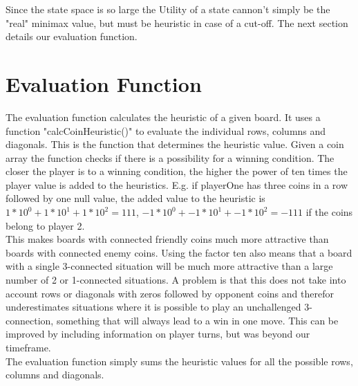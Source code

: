 \documentclass[11pt, a4paper]{article}
\begin{document}
Since the state space is so large the Utility of a state cannon't simply be the "real" minimax value, but must be heuristic in case of a cut-off. The next section details our evaluation function.

\section*{Evaluation Function}

The evaluation function calculates the heuristic of a given board. It uses a function "calcCoinHeuristic()" to evaluate the individual rows, columns and diagonals. This is the function that determines the heuristic value. Given a coin array the function checks if there is a possibility for a winning condition. The closer the player is to a winning condition, the higher the power of ten times the player value is added to the heuristics. E.g. if playerOne has three coins in a row followed by one null value, the added value to the heuristic is $1*10^0+1*10^1+1*10^2 = 111$, $-1*10^0+-1*10^1+-1*10^2 = -111$ if the coins belong to player 2.\\

This makes boards with connected friendly coins much more attractive than boards with connected enemy coins. Using the factor ten also means that a board with a single 3-connected situation will be much more attractive than a large number of 2 or 1-connected situations. A problem is that this does not take into account rows or diagonals with zeros followed by opponent coins and therefor underestimates situations where it is possible to play an unchallenged 3-connection, something that will always lead to a win in one move. This can be improved by including information on player turns, but was beyond our timeframe.\\

The evaluation function simply sums the heuristic values for all the possible rows, columns and diagonals.\\

%
\end{document}
